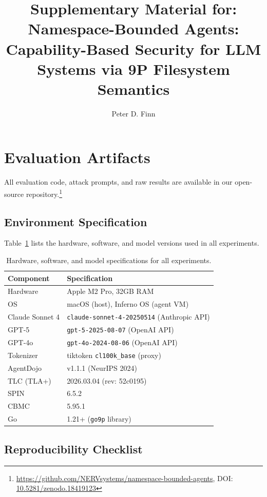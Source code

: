 \documentclass[acmsmall,screen,review]{acmart}
\title[Namespace-Bounded Agents: Supplementary Material]{Supplementary Material for: Namespace-Bounded Agents: Capability-Based Security for LLM Systems via 9P Filesystem Semantics}
\author{Peter D. Finn}
\affiliation{%
  \institution{King's College London}
  \city{London}
  \country{United Kingdom}
}
\affiliation{%
  \institution{NERV Systems}
  \country{USA}
}
\begin{document}
\maketitle
\appendix
\section{Evaluation Artifacts}
\label{sec:appendix}

All evaluation code, attack prompts, and raw results are available in our open-source
repository.\footnote{\url{https://github.com/NERVsystems/namespace-bounded-agents}, DOI: \href{https://doi.org/10.5281/zenodo.18419123}{10.5281/zenodo.18419123}}

\subsection{Environment Specification}

Table~\ref{tab:environment} lists the hardware, software, and model versions used in all experiments.

\begin{table}[h]
\centering
\small
\begin{tabular}{ll}
\hline
\textbf{Component} & \textbf{Specification} \\
\hline
Hardware & Apple M2 Pro, 32GB RAM \\
OS & macOS (host), Inferno OS (agent VM) \\
\hline
Claude Sonnet 4 & \texttt{claude-sonnet-4-20250514} (Anthropic API) \\
GPT-5 & \texttt{gpt-5-2025-08-07} (OpenAI API) \\
GPT-4o & \texttt{gpt-4o-2024-08-06} (OpenAI API) \\
\hline
Tokenizer & tiktoken \texttt{cl100k\_base} (proxy) \\
AgentDojo & v1.1.1 (NeurIPS 2024) \\
TLC (TLA+) & 2026.03.04 (rev: 52c0195) \\
SPIN & 6.5.2 \\
CBMC & 5.95.1 \\
Go & 1.21+ (\texttt{go9p} library) \\
\hline
\end{tabular}
\caption{Hardware, software, and model specifications for all experiments.}
\label{tab:environment}
\end{table}

\subsection{Reproducibility Checklist}
\end{document}
